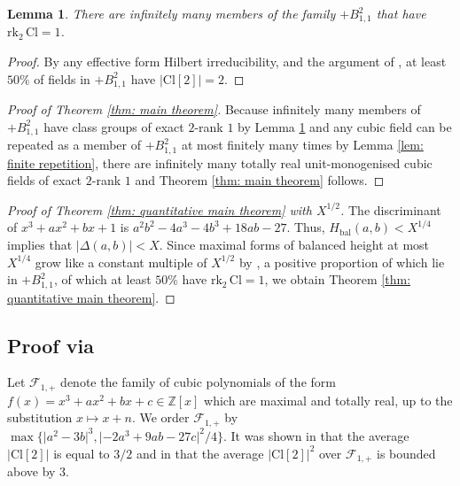 \documentclass[a4paper, 12pt]{amsart}
\newcommand{\rk}{\mathrm{rk}}
\newtheorem{lemma}{Lemma}
\newcommand{\Cl}{\mathrm{Cl}}
\begin{document}
\begin{lemma}\label{lem: infinitely many have rk_2 = 1}
    There are infinitely many members of the family $+B_{1,1}^2$ that have $\rk_2 \, \Cl = 1$.
\end{lemma}
\begin{proof}
    By any effective form Hilbert irreducibility, \cite[Theorem 5]{MR4891959} and the argument of \cite[Theorem 2.8]{MR4891959}, at least $50\%$ of fields in $+B_{1,1}^2$ have $\lvert \Cl[2] \rvert = 2$. 
\end{proof}

\begin{proof}[Proof of Theorem \ref{thm: main theorem}]
Because infinitely many members of $+B_{1,1}^2$ have class groups of exact $2$-rank $1$ by Lemma \ref{lem: infinitely many have rk_2 = 1} and any cubic field can be repeated as a member of $+B_{1,1}^2$ at most finitely many times by Lemma \ref{lem: finite repetition}, there are infinitely many totally real unit-monogenised cubic fields of exact $2$-rank $1$ and Theorem \ref{thm: main theorem} follows. 
\end{proof}

\begin{proof}[Proof of Theorem \ref{thm: quantitative main theorem} with $X^{1/2}$]
    The discriminant of $x^3+ax^2+bx+1$ is $a^2 b^2 - 4 a^3  - 4 b^3  + 18 a b -27$. Thus, $H_{\mathrm{bal}}(a,b) < X^{1/4}$ implies that $\lvert \Delta(a,b) \rvert < X$. Since maximal forms of balanced height at most $X^{1/4}$ grow like a constant multiple of $X^{1/2}$ by \cite[Theorem 5.1]{MR4891959}, a positive proportion of which lie in $+B_{1,1}^2$, of which at least $50\%$ have $\rk_2 \, \Cl = 1$, we obtain Theorem \ref{thm: quantitative main theorem}.
\end{proof}

\subsection{Proof via \cite{2506.05539}} \label{sec: proof BSS} Let $\mathcal{F}_{1,+}$ denote the family of cubic polynomials of the form $f(x) = x^3+ax^2+bx+c \in \mathbb{Z}[x]$ which are maximal and totally real, up to the substitution $x \mapsto x+n$. We order $\mathcal{F}_{1,+}$ by $\max\{\lvert a^2 - 3b \rvert^3, \lvert -2a^3+9ab-27c \rvert^2/4 \}$. It was shown in \cite[Theorem 4]{BHSpreprint} that the average $\lvert \Cl[2] \rvert$ is equal to $3/2$
and in \cite[Theorem 1.2]{2506.05539} that the average $\lvert\Cl[2]\rvert^2$ over $\mathcal{F}_{1,+}$ is bounded above by $3$. 
\end{document}
